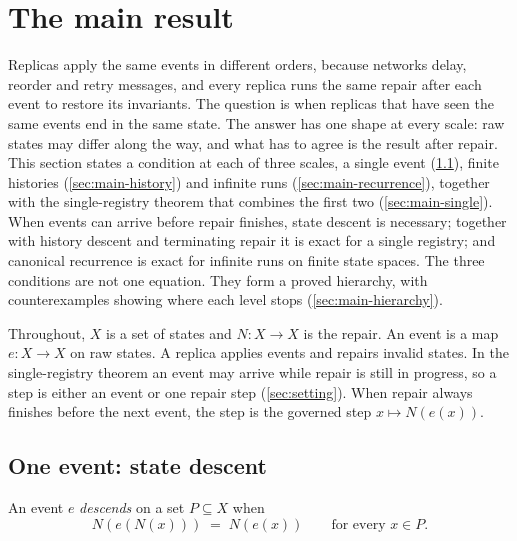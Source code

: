 
\section{The main result}\label{sec:main}

Replicas apply the same events in different orders, because networks delay, reorder and retry
messages, and every replica runs the same repair after each event to restore its invariants. The
question is when replicas that have seen the same events end in the same state. The answer has one
shape at every scale: raw states may differ along the way, and what has to agree is the result after
repair. This section states a condition at each of three scales, a single event
(\cref{sec:main-state}), finite histories (\cref{sec:main-history}) and infinite runs
(\cref{sec:main-recurrence}), together with the single-registry theorem that combines the first two
(\cref{sec:main-single}). When events can arrive before repair finishes, state descent is necessary; together with history descent and terminating
repair it is exact for a single registry; and canonical recurrence is exact for infinite runs on finite
state spaces. The three conditions are not one equation. They form a proved hierarchy,
with counterexamples showing where each level stops (\cref{sec:main-hierarchy}).

Throughout, $X$ is a set of states and $N : X \to X$ is the repair. An event is a map
$e : X \to X$ on raw states. A replica applies events and repairs invalid states. In the
single-registry theorem an event may arrive while repair is still in progress, so a step is either an
event or one repair step (\cref{sec:setting}). When repair always finishes before the next event, the
step is the governed step $x \mapsto N(e(x))$.

\subsection{One event: state descent}\label{sec:main-state}

\begin{definition}\label{def:descent}
An event $e$ \emph{descends} on a set $P \subseteq X$ when
\[
  N(e(N(x))) \;=\; N(e(x)) \qquad\text{for every } x \in P.
\]
\end{definition}

